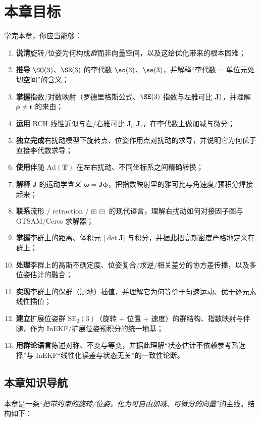 \section*{本章目标}
学完本章，你应当能够：
\begin{enumerate}
  \item \textbf{说清}旋转/位姿为何构成\emph{群}而非向量空间，以及这给优化带来的根本困难；
  \item \textbf{推导} $\SO(3)$、$\SE(3)$ 的李代数 $\so(3)$、$\se(3)$，并解释“李代数 = 单位元处切空间”的含义；
  \item \textbf{掌握}指数/对数映射（罗德里格斯公式、$\SE(3)$ 指数与左雅可比 $\mathbf{J}$），并理解 $\boldsymbol{\rho}\neq\mathbf{t}$ 的来由；
  \item \textbf{运用} BCH 线性近似与左/右雅可比 $\mathbf{J}_l,\mathbf{J}_r$，在李代数上做加减与微分；
  \item \textbf{独立完成}右扰动模型下旋转点、位姿作用点对扰动的求导，并说明它为何优于直接李代数求导；
  \item \textbf{使用}伴随 $\mathrm{Ad}(\mathbf{T})$ 在左右扰动、不同坐标系之间精确转换；
  \item \textbf{解释} $\mathbf{J}$ 的运动学含义 $\boldsymbol{\omega}=\mathbf{J}\dot{\boldsymbol{\phi}}$，把指数映射里的雅可比与角速度/预积分焊接起来；
  \item \textbf{联系}流形 / retraction / $\boxplus\,\boxminus$ 的现代语言，理解右扰动如何对接因子图与 GTSAM/Ceres 求解器；
  \item \textbf{掌握}李群上的距离、体积元 $|\det\mathbf{J}|$ 与积分，并据此把高斯密度严格地定义在群上；
  \item \textbf{处理}李群上的高斯不确定度、位姿复合/求逆/相关差分的协方差传播，以及多位姿估计的融合；
  \item \textbf{实现}李群上的保群（测地）插值，并理解它为何等价于匀速运动、优于逐元素线性插值；
  \item \textbf{建立}扩展位姿群 $\mathrm{SE}_2(3)$（旋转 + 位置 + 速度）的群结构、指数映射与伴随，作为 InEKF/扩展位姿预积分的统一地基；
  \item \textbf{用群论语言}陈述对称、不变与等变，并据此理解“状态估计不依赖参考系选择”与 InEKF“线性化误差与状态无关”的一致性论断。
\end{enumerate}

\subsection*{本章知识导航}
本章是一条“\emph{把带约束的旋转/位姿，化为可自由加减、可微分的向量}”的主线。结构如下：


